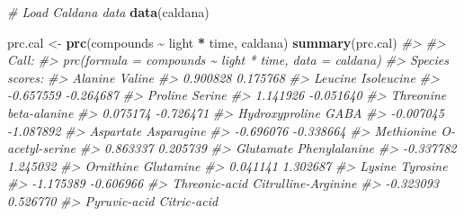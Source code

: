 \documentclass[
]{article}
\newenvironment{Shaded}{\begin{snugshade}}{\end{snugshade}}
\newcommand{\CommentTok}[1]{\textcolor[rgb]{0.56,0.35,0.01}{\textit{#1}}}
\newcommand{\FunctionTok}[1]{\textcolor[rgb]{0.13,0.29,0.53}{\textbf{#1}}}
\newcommand{\NormalTok}[1]{#1}
\newcommand{\OtherTok}[1]{\textcolor[rgb]{0.56,0.35,0.01}{#1}}
\newcommand{\SpecialCharTok}[1]{\textcolor[rgb]{0.81,0.36,0.00}{\textbf{#1}}}
\begin{document}
\begin{Shaded}
\begin{Highlighting}[]
\CommentTok{\# Load Caldana data}
\FunctionTok{data}\NormalTok{(caldana)}

\NormalTok{prc.cal }\OtherTok{\textless{}{-}} \FunctionTok{prc}\NormalTok{(compounds }\SpecialCharTok{\textasciitilde{}}\NormalTok{ light }\SpecialCharTok{*}\NormalTok{ time, caldana)}
\FunctionTok{summary}\NormalTok{(prc.cal)}
\CommentTok{\#\textgreater{} }
\CommentTok{\#\textgreater{} Call:}
\CommentTok{\#\textgreater{} prc(formula = compounds \textasciitilde{} light * time, data = caldana) }
\CommentTok{\#\textgreater{} Species scores:}
\CommentTok{\#\textgreater{}                    Alanine                     Valine }
\CommentTok{\#\textgreater{}                   0.900828                   0.175768 }
\CommentTok{\#\textgreater{}                    Leucine                 Isoleucine }
\CommentTok{\#\textgreater{}                  {-}0.657559                  {-}0.264687 }
\CommentTok{\#\textgreater{}                    Proline                     Serine }
\CommentTok{\#\textgreater{}                   1.141926                  {-}0.051640 }
\CommentTok{\#\textgreater{}                  Threonine               beta{-}alanine }
\CommentTok{\#\textgreater{}                   0.075174                  {-}0.726471 }
\CommentTok{\#\textgreater{}             Hydroxyproline                       GABA }
\CommentTok{\#\textgreater{}                  {-}0.007045                  {-}1.087892 }
\CommentTok{\#\textgreater{}                  Aspartate                 Asparagine }
\CommentTok{\#\textgreater{}                  {-}0.696076                  {-}0.338664 }
\CommentTok{\#\textgreater{}                 Methionine            O{-}acetyl{-}serine }
\CommentTok{\#\textgreater{}                   0.863337                   0.205739 }
\CommentTok{\#\textgreater{}                  Glutamate              Phenylalanine }
\CommentTok{\#\textgreater{}                  {-}0.337782                   1.245032 }
\CommentTok{\#\textgreater{}                  Ornithine                  Glutamine }
\CommentTok{\#\textgreater{}                   0.041141                   1.302687 }
\CommentTok{\#\textgreater{}                     Lysine                   Tyrosine }
\CommentTok{\#\textgreater{}                  {-}1.175389                  {-}0.606966 }
\CommentTok{\#\textgreater{}              Threonic{-}acid        Citrulline{-}Arginine }
\CommentTok{\#\textgreater{}                  {-}0.323093                   0.526770 }
\CommentTok{\#\textgreater{}               Pyruvic{-}acid                Citric{-}acid }

\end{Highlighting}
\end{Shaded}
\end{document}
